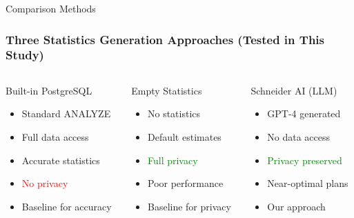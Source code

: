 \documentclass[smaller]{beamer}
\begin{document}
\begin{frame}{Comparison Methods}
\frametitle{Three Statistics Generation Approaches (Tested in This Study)}

\begin{columns}[T]
\begin{column}{0.33\textwidth}
\begin{block}{Built-in PostgreSQL}
\begin{itemize}
    \item Standard ANALYZE
    \item Full data access
    \item Accurate statistics
    \item \textcolor{red}{No privacy}
    \item Baseline for accuracy
\end{itemize}
\end{block}
\end{column}

\begin{column}{0.33\textwidth}
\begin{block}{Empty Statistics}
\begin{itemize}
    \item No statistics
    \item Default estimates
    \item \textcolor{green}{Full privacy}
    \item Poor performance
    \item Baseline for privacy
\end{itemize}
\end{block}
\end{column}

\begin{column}{0.33\textwidth}
\begin{block}{Schneider AI (LLM)}
\begin{itemize}
    \item GPT-4 generated
    \item No data access
    \item \textcolor{green}{Privacy preserved}
    \item Near-optimal plans
    \item Our approach
\end{itemize}
\end{block}
\end{column}
\end{columns}

\vspace{0.5cm}


\end{frame}
\end{document}
